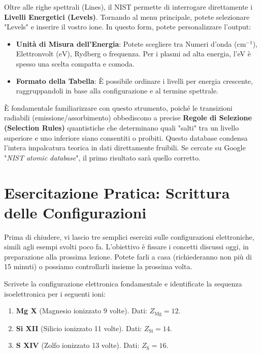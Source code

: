 Oltre alle righe spettrali (Lines), il NIST permette di interrogare direttamente i \textbf{Livelli Energetici (Levels)}.
Tornando al menu principale, potete selezionare "Levels" e inserire il vostro ione. In questo form, potete personalizzare l'output:
\begin{itemize}
\item \textbf{Unità di Misura dell'Energia}: Potete scegliere tra Numeri d'onda ($\text{cm}^{-1}$), Elettronvolt ($\text{eV}$), Rydberg o frequenza. Per i plasmi ad alta energia, l'eV è spesso una scelta compatta e comoda.
\item \textbf{Formato della Tabella}: È possibile ordinare i livelli per energia crescente, raggruppandoli in base alla configurazione e al termine spettrale.
\end{itemize}

È fondamentale familiarizzare con questo strumento, poiché le transizioni radiabili (emissione/assorbimento) obbediscono a precise \textbf{Regole di Selezione (Selection Rules)} quantistiche che determinano quali "salti" tra un livello superiore e uno inferiore siano consentiti o proibiti. Questo database condensa l'intera impalcatura teorica in dati direttamente fruibili. Se cercate su Google "\textit{NIST atomic database}", il primo risultato sarà quello corretto.

\section{Esercitazione Pratica: Scrittura delle Configurazioni}

Prima di chiudere, vi lascio tre semplici esercizi sulle configurazioni elettroniche, simili agli esempi svolti poco fa. L'obiettivo è fissare i concetti discussi oggi, in preparazione alla prossima lezione. Potete farli a casa (richiederanno non più di 15 minuti) o possiamo controllarli insieme la prossima volta.

Scrivete la configurazione elettronica fondamentale e identificate la sequenza isoelettronica per i seguenti ioni:
\begin{enumerate}
\item \textbf{Mg X} (Magnesio ionizzato 9 volte). Dati: $Z_{\text{Mg}} = 12$.
\item \textbf{Si XII} (Silicio ionizzato 11 volte). Dati: $Z_{\text{Si}} = 14$.
\item \textbf{S XIV} (Zolfo ionizzato 13 volte). Dati: $Z_{\text{S}} = 16$.
\end{enumerate}

